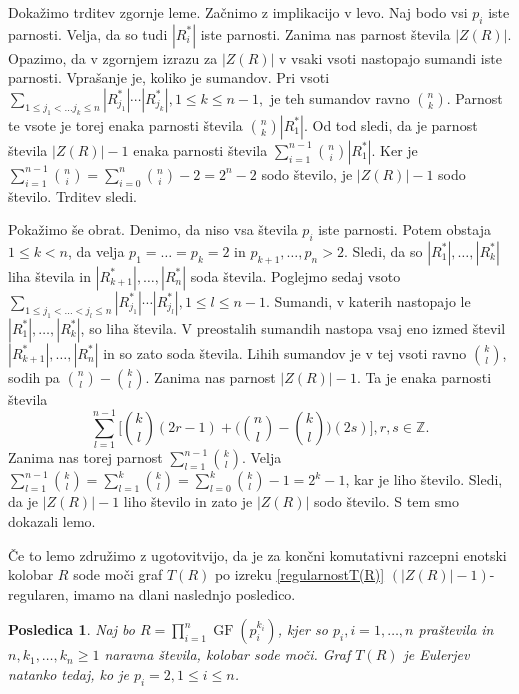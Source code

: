 \documentclass[a4paper, 12pt]{amsart}
\theoremstyle{definition} %
\theoremstyle{plain} %
\newtheorem{posledica}[definicija]{Posledica}
\newcommand{\Z}{\mathbb Z}
\DeclareMathOperator{\GF}{GF}
\begin{document}
Dokažimo trditev zgornje leme. Začnimo z implikacijo v levo. Naj bodo vsi $p_i$ iste parnosti. Velja, da so tudi $|R_i^*|$ iste parnosti. Zanima nas parnost števila $|Z(R)|$. Opazimo, da v zgornjem izrazu za $|Z(R)|$ v vsaki vsoti nastopajo sumandi iste parnosti. Vprašanje je, koliko je sumandov. Pri vsoti $\sum_{1\le j_1 < \dots j_k \le n}|R_{j_1}^*| \cdots |R_{j_k}^*|, 1 \le k \le n-1,$ je teh sumandov ravno ${n \choose k}$. Parnost te vsote je torej enaka parnosti števila ${n \choose k} |R_1^*|$. Od tod sledi, da je parnost števila $|Z(R)| -1$ enaka parnosti števila $\sum_{i=1}^{n-1} {n \choose i} |R_1^*|$. Ker je $\sum_{i=1}^{n-1} {n \choose i} = \sum_{i=0}^{n} {n \choose i} - 2 = 2^n - 2 $ sodo število, je $|Z(R)| -1$ sodo število. Trditev sledi.

Pokažimo še obrat. Denimo, da niso vsa števila $p_i$ iste parnosti. Potem obstaja $1\le k <n$, da velja $p_1 = \dots=p_k =2$ in $p_{k+1},\dots,p_n >2$. Sledi, da so $|R_1^*|,\dots,|R_k^*|$ liha števila in $|R_{k+1}^*|, \dots, |R_n^*|$ soda števila.
Poglejmo sedaj vsoto  $\sum_{1\le j_1 < \dots < j_l \le n}|R_{j_1}^*| \cdots |R_{j_l}^*|, 1 \le l \le n-1$. Sumandi, v katerih nastopajo le $|R_1^*|,\dots,|R_k^*|$, so liha števila. V preostalih sumandih nastopa vsaj eno izmed števil $|R_{k+1}^*|,\dots,|R_n^*|$ in so zato soda števila. Lihih sumandov je v tej vsoti ravno ${k \choose l}$, sodih pa ${n \choose l} - {k \choose l}$. Zanima nas parnost $|Z(R)|-1$. Ta je enaka parnosti števila
$$
\sum_{l=1}^{n-1} \Big[ {k \choose l} (2r-1) +\Big({n \choose l} - {k \choose l}\Big) (2s) \Big], r,s\in \Z.
$$
Zanima nas torej parnost $\sum_{l=1}^{n-1}  {k \choose l} $. Velja $\sum_{l=1}^{n-1}{ k\choose l} = \sum_{l=1}^k {k \choose l} = \sum_{l=0}^k {k \choose l} - 1 = 2^k -1$, kar je liho število. Sledi, da je $|Z(R)| -1$ liho število in zato je $|Z(R)| $ sodo število. S tem smo dokazali lemo.
\endproof

Če to lemo združimo z ugotovitvijo, da je za končni komutativni razcepni enotski kolobar $R$ sode moči graf $T(R)$ po izreku \ref{regularnostT(R)} $( |Z(R)| -1)$-regularen, imamo na dlani naslednjo posledico.

\begin{posledica}
Naj bo $R=\prod_{i=1}^n \GF(p_i^{k_i})$, kjer so $p_i,i=1,\dots,n$ praštevila in $n, k_1,\dots,k_n\ge 1$ naravna števila, kolobar sode moči. Graf $T(R)$ je Eulerjev natanko tedaj, ko je $p_i=2, 1\le i\le n$. 
\end{posledica}
\end{document}
